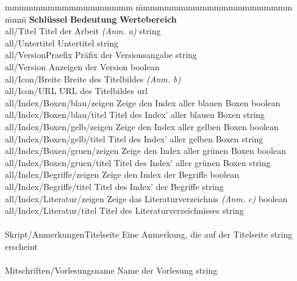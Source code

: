 			\begin{tabbing}
				mmmmmmmmmmmmmmmmmm				\= mmmmmmmmmmmmmmmmmmmmmm 								\=mmm\=\kill
				\textbf{Schlüssel}				\> \textbf{Bedeutung}									\> \textbf{Wertebereich}	\\
				all/Titel	 					\> Titel der Arbeit	\emph{(Anm. a)}						\> string					\\
				all/Untertitel 					\> Untertitel											\> string					\\
				all/VersionPraefix 				\> Präfix der Versionsangabe							\> string					\\
				all/Version 					\> Anzeigen der Version									\> boolean 					\\
				all/Icon/Breite 				\> Breite des Titelbildes \emph{(Anm. b)}				\> \doubleplus				\\
				all/Icon/URL					\> URL des Titelbildes									\> url						\\
				all/Index/Boxen/blau/zeigen 	\> Zeige den Index aller blauen Boxen					\> boolean 					\\
				all/Index/Boxen/blau/titel 		\> Titel des Index' aller blauen Boxen					\> string					\\
				all/Index/Boxen/gelb/zeigen 	\> Zeige den Index aller gelben Boxen					\> boolean 					\\
				all/Index/Boxen/gelb/titel 		\> Titel des Index' aller gelben Boxen					\> string					\\
				all/Index/Boxen/gruen/zeigen 	\> Zeige den Index aller grünen Boxen					\> boolean 					\\
				all/Index/Boxen/gruen/titel 	\> Titel des Index' aller grünen Boxen					\> string					\\
				all/Index/Begriffe/zeigen 		\> Zeige den Index der Begriffe							\> boolean					\\
				all/Index/Begriffe/titel 		\> Titel des Index' der Begriffe						\> string					\\
				all/Index/Literatur/zeigen		\> Zeige das Literaturverzeichnis \emph{(Anm. c)}		\> boolean					\\
				all/Index/Literatur/titel		\> Titel des Literaturverzeichnisses	\> string									\\
				\\
				Skript/AnmerkungenTitelseite 	\> Eine Anmerkung, die auf der Titelseite\> string									\\
												\> erscheint																		\\
				\\
				Mitschriften/Vorlesungsname 	\> Name der Vorlesung 					\> string									\\

\end{tabbing}
